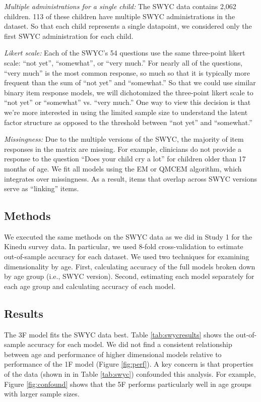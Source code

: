 \documentclass[11pt]{article}
\begin{document}
\textit{Multiple administrations for a single child:} The SWYC data contains 2,062 children. 113 of these children have multiple SWYC administrations in the dataset. So that each child represents a single datapoint, we considered only the first SWYC administration for each child.

\textit{Likert scale:} Each of the SWYC's 54 questions use the same three-point likert scale: “not yet”, “somewhat”, or “very much.” For nearly all of the questions, “very much” is the most common response, so much so that it is typically more frequent than the sum of “not yet” and “somewhat.” So that we could use similar binary item response models, we will dichotomized the three-point likert scale to “not yet” or “somewhat” vs. “very much.” One way to view this decision is that we’re more interested in using the limited sample size to understand the latent factor structure as opposed to the threshold between “not yet” and “somewhat.”

\textit{Missingness:} Due to the multiple versions of the SWYC, the majority of item responses in the matrix are missing. For example, clinicians do not provide a response to the question “Does your child cry a lot” for children older than 17 months of age. We fit all models using the EM or QMCEM algorithm, which integrates over missingness. As a result, items that overlap across SWYC versions serve as “linking” items.

\subsection*{Methods}
We executed the same methods on the SWYC data as we did in Study 1 for the Kinedu survey data. In particular, we used 8-fold cross-validation to estimate out-of-sample accuracy for each dataset. We used two techniques for examining dimensionality by age. First, calculating accuracy of the full models broken down by age group (i.e., SWYC version). Second, estimating each model separately for each age group and calculating accuracy of each model.

\subsection*{Results}

The 3F model fits the SWYC data best. Table \ref{tab:swycresults} shows the out-of-sample accuracy for each model. We did not find a consistent relationship between age and performance of higher dimensional models relative to performance of the 1F model (Figure \ref{fig:perf}). A key concern is that properties of the data (shown in in Table \ref{tab:swyc}) confounded this analysis. For example, Figure \ref{fig:confound} shows that the 5F performs particularly well in age groups with larger sample sizes.
\end{document}
